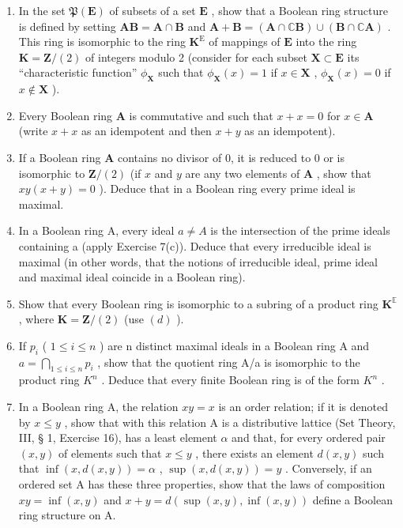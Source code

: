 \begin{enumerate}
\def\labelenumi{(\alph{enumi})}
\item
  In the set \(\mathfrak{P}(\mathbf{E})\) of subsets of a set \(\mathbf{E}\) , show that a Boolean ring structure is defined by setting \(\mathbf{AB} = \mathbf{A} \cap \mathbf{B}\) and \(\mathbf{A} + \mathbf{B} = (\mathbf{A} \cap \mathbb{C}\mathbf{B}) \cup (\mathbf{B} \cap \mathbb{C}\mathbf{A})\) . This ring is isomorphic to the ring \(\mathbf{K}^{\mathrm{E}}\) of mappings of \(\mathbf{E}\) into the ring \(\mathbf{K} = \mathbf{Z}/(2)\) of integers modulo 2 (consider for each subset \(\mathbf{X} \subset \mathbf{E}\) its ``characteristic function'' \(\phi_{\mathbf{X}}\) such that \(\phi_{\mathbf{X}}(x) = 1\) if \(x \in \mathbf{X}\) , \(\phi_{\mathbf{X}}(x) = 0\) if \(x \notin \mathbf{X}\) ).
\item
  Every Boolean ring \(\mathbf{A}\) is commutative and such that \(x + x = 0\) for \(x \in \mathbf{A}\) (write \(x + x\) as an idempotent and then \(x + y\) as an idempotent).
\item
  If a Boolean ring \(\mathbf{A}\) contains no divisor of 0, it is reduced to 0 or is isomorphic to \(\mathbf{Z} / (2)\) (if \(x\) and \(y\) are any two elements of \(\mathbf{A}\) , show that \(xy(x + y) = 0\) ). Deduce that in a Boolean ring every prime ideal is maximal.
\item
  In a Boolean ring A, every ideal \(a \neq A\) is the intersection of the prime ideals containing a (apply Exercise 7(c)). Deduce that every irreducible ideal is maximal (in other words, that the notions of irreducible ideal, prime ideal and maximal ideal coincide in a Boolean ring).
\item
  Show that every Boolean ring is isomorphic to a subring of a product ring \(\mathbf{K}^{\mathbb{E}}\) , where \(\mathbf{K} = \mathbf{Z}/(2)\) (use \((d)\) ).
\item
  If \(p_{i}\) ( \(1 \leqslant i \leqslant n\) ) are n distinct maximal ideals in a Boolean ring A and \(a = \bigcap_{1 \leqslant i \leqslant n} p_{i}\) , show that the quotient ring A/a is isomorphic to the product ring \(K^{n}\) . Deduce that every finite Boolean ring is of the form \(K^{n}\) .
\item
  In a Boolean ring A, the relation \(xy = x\) is an order relation; if it is denoted by \(x \leqslant y\) , show that with this relation A is a distributive lattice (Set Theory, III, § 1, Exercise 16), has a least element \(\alpha\) and that, for every ordered pair \((x, y)\) of elements such that \(x \leqslant y\) , there exists an element \(d(x, y)\) such that \(\inf(x, d(x, y)) = \alpha\) , \(\sup(x, d(x, y)) = y\) . Conversely, if an ordered set A has these three properties, show that the laws of composition \(xy = \inf(x, y)\) and \(x + y = d(\sup(x, y), \inf(x, y))\) define a Boolean ring structure on A.
\end{enumerate}

